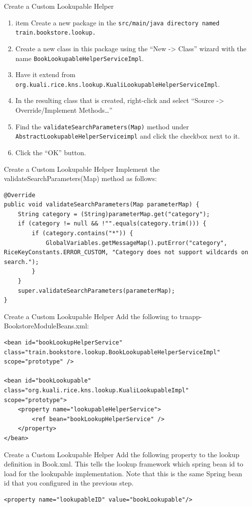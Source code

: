 \documentclass[xcolor=dvipsnames,14pt,professionalfonts]{beamer}
\begin{document}
  \begin{frame}{Create a Custom Lookupable Helper}
 \begin{enumerate}
 \item item Create a new package in the \texttt{src/main/java directory named train.bookstore.lookup.}
 \item Create a new class in this package using the “New -> Class”
   wizard with the name \texttt{BookLookupableHelperServiceImpl}.  
 \item Have it extend from \texttt{org.kuali.rice.kns.lookup.KualiLookupableHelperServiceImpl}.
 \item In the resulting class that is created, right-click and select “Source -> Override/Implement Methods…”
 \item Find the \texttt{validateSearchParameters(Map)} method under \texttt{AbstractLookupableHelperServiceimpl} and click the checkbox next to it.
 \item Click the “OK” button.
   \end{enumerate}
   \end{frame}

\begin{frame}[fragile]{Create a Custom Lookupable Helper}
 Implement the validateSearchParameters(Map) method as follows:
    \begin{verbatim}
@Override
public void validateSearchParameters(Map parameterMap) {
	String category = (String)parameterMap.get("category");
	if (category != null && !"".equals(category.trim())) {
		if (category.contains("*")) {
			GlobalVariables.getMessageMap().putError("category", RiceKeyConstants.ERROR_CUSTOM, "Category does not support wildcards on search.");
		}
	}
	super.validateSearchParameters(parameterMap);
}
    \end{verbatim}
\end{frame}

\begin{frame}[fragile]{Create a Custom Lookupable Helper}
Add the following to trnapp-BookstoreModuleBeans.xml:
    \begin{verbatim}
<bean id="bookLookupHelperService" class="train.bookstore.lookup.BookLookupableHelperServiceImpl" scope="prototype" />

<bean id="bookLookupable" class="org.kuali.rice.kns.lookup.KualiLookupableImpl" scope="prototype">
	<property name="lookupableHelperService">
		<ref bean="bookLookupHelperService" />
	</property>
</bean>
    \end{verbatim}
\end{frame}

\begin{frame}[fragile]{Create a Custom Lookupable Helper}
Add the following property to the lookup definition in Book.xml.  This tells the lookup framework which spring bean id to load for the lookupable implementation.  Note that this is the same Spring bean id that you configured in the previous step. 
    \begin{verbatim}
<property name="lookupableID" value="bookLookupable"/>
    \end{verbatim}
\end{frame}
\end{document}
